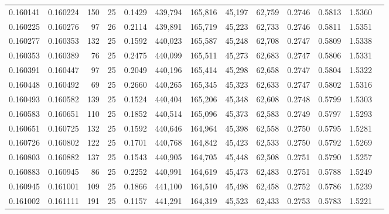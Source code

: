 \begin{tabular}{rrrrrrrrrrrrr}
0.160141 & 0.160224 &   150 &  25 &                                     0.1429 & 439,794 & 165,816 &  45,197 &  62,759 & 0.2746 & 0.5813 & 1.5360 \\
0.160225 & 0.160276 &    97 &  26 &                                     0.2114 & 439,891 & 165,719 &  45,223 &  62,733 & 0.2746 & 0.5811 & 1.5351 \\
0.160277 & 0.160353 &   132 &  25 &                                     0.1592 & 440,023 & 165,587 &  45,248 &  62,708 & 0.2747 & 0.5809 & 1.5338 \\
0.160353 & 0.160389 &    76 &  25 &                                     0.2475 & 440,099 & 165,511 &  45,273 &  62,683 & 0.2747 & 0.5806 & 1.5331 \\
0.160391 & 0.160447 &    97 &  25 &                                     0.2049 & 440,196 & 165,414 &  45,298 &  62,658 & 0.2747 & 0.5804 & 1.5322 \\
0.160448 & 0.160492 &    69 &  25 &                                     0.2660 & 440,265 & 165,345 &  45,323 &  62,633 & 0.2747 & 0.5802 & 1.5316 \\
0.160493 & 0.160582 &   139 &  25 &                                     0.1524 & 440,404 & 165,206 &  45,348 &  62,608 & 0.2748 & 0.5799 & 1.5303 \\
0.160583 & 0.160651 &   110 &  25 &                                     0.1852 & 440,514 & 165,096 &  45,373 &  62,583 & 0.2749 & 0.5797 & 1.5293 \\
0.160651 & 0.160725 &   132 &  25 &                                     0.1592 & 440,646 & 164,964 &  45,398 &  62,558 & 0.2750 & 0.5795 & 1.5281 \\
0.160726 & 0.160802 &   122 &  25 &                                     0.1701 & 440,768 & 164,842 &  45,423 &  62,533 & 0.2750 & 0.5792 & 1.5269 \\
0.160803 & 0.160882 &   137 &  25 &                                     0.1543 & 440,905 & 164,705 &  45,448 &  62,508 & 0.2751 & 0.5790 & 1.5257 \\
0.160883 & 0.160945 &    86 &  25 &                                     0.2252 & 440,991 & 164,619 &  45,473 &  62,483 & 0.2751 & 0.5788 & 1.5249 \\
0.160945 & 0.161001 &   109 &  25 &                                     0.1866 & 441,100 & 164,510 &  45,498 &  62,458 & 0.2752 & 0.5786 & 1.5239 \\
0.161002 & 0.161111 &   191 &  25 &                                     0.1157 & 441,291 & 164,319 &  45,523 &  62,433 & 0.2753 & 0.5783 & 1.5221 \\

\end{tabular}
